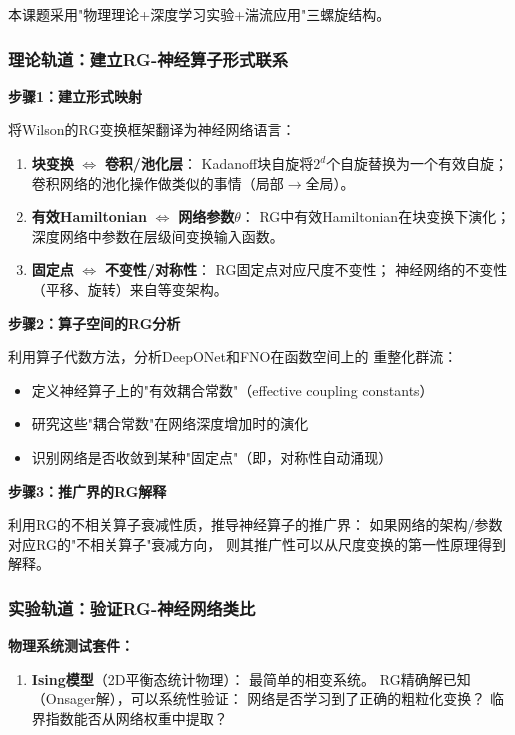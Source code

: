 \documentclass[12pt,a4paper,twoside]{article}
\begin{document}
\begin{inversation}
本课题采用"物理理论+深度学习实验+湍流应用"三螺旋结构。

\subsubsection{理论轨道：建立RG-神经算子形式联系}

\textbf{步骤1：建立形式映射}

将Wilson的RG变换框架翻译为神经网络语言：

\begin{enumerate}
    \item \textbf{块变换} $\Leftrightarrow$ \textbf{卷积/池化层}：
        Kadanoff块自旋将$2^d$个自旋替换为一个有效自旋；
        卷积网络的池化操作做类似的事情（局部$\to$全局）。
    \item \textbf{有效Hamiltonian} $\Leftrightarrow$ \textbf{网络参数}$\theta$：
        RG中有效Hamiltonian在块变换下演化；
        深度网络中参数在层级间变换输入函数。
    \item \textbf{固定点} $\Leftrightarrow$ \textbf{不变性/对称性}：
        RG固定点对应尺度不变性；
        神经网络的不变性（平移、旋转）来自等变架构。
\end{enumerate}

\textbf{步骤2：算子空间的RG分析}

利用算子代数方法，分析DeepONet和FNO在函数空间上的
重整化群流：
\begin{itemize}
    \item 定义神经算子上的"有效耦合常数"（effective coupling constants）
    \item 研究这些"耦合常数"在网络深度增加时的演化
    \item 识别网络是否收敛到某种"固定点"（即，对称性自动涌现）
\end{itemize}

\textbf{步骤3：推广界的RG解释}

利用RG的不相关算子衰减性质，推导神经算子的推广界：
如果网络的架构/参数对应RG的"不相关算子"衰减方向，
则其推广性可以从尺度变换的第一性原理得到解释。

\subsubsection{实验轨道：验证RG-神经网络类比}

\textbf{物理系统测试套件：}

\begin{enumerate}
    \item \textbf{Ising模型}（2D平衡态统计物理）：
        最简单的相变系统。
        RG精确解已知（Onsager解），可以系统性验证：
        网络是否学习到了正确的粗粒化变换？
        临界指数能否从网络权重中提取？


\end{enumerate}
\end{inversation}
\end{document}
